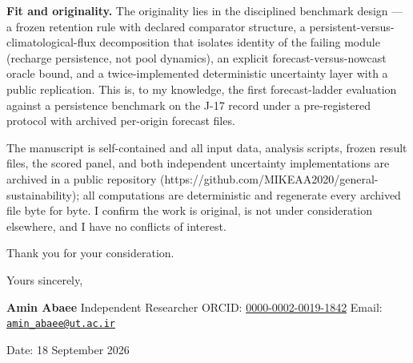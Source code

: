 \documentclass[11pt]{article}
\begin{document}
\textbf{Fit and originality.} The originality lies in the disciplined
benchmark design --- a frozen retention rule with declared comparator
structure, a persistent-versus-climatological-flux decomposition that
isolates identity of the failing module (recharge persistence, not pool
dynamics), an explicit forecast-versus-nowcast oracle bound, and a
twice-implemented deterministic uncertainty layer with a public
replication. This is, to my knowledge, the first forecast-ladder
evaluation against a persistence benchmark on the J-17 record under a
pre-registered protocol with archived per-origin forecast files.

The manuscript is self-contained and all input data, analysis scripts,
frozen result files, the scored panel, and both independent uncertainty
implementations are archived in a public repository
(https://github.com/MIKEAA2020/general-sustainability); all computations
are deterministic and regenerate every archived file byte for byte. I
confirm the work is original, is not under consideration elsewhere, and
I have no conflicts of interest.

Thank you for your consideration.

Yours sincerely,

\textbf{Amin Abaee} Independent Researcher ORCID:
\href{https://orcid.org/0000-0002-0019-1842}{0000-0002-0019-1842} Email:
\href{mailto:amin_abaee@ut.ac.ir}{\nolinkurl{amin\_abaee@ut.ac.ir}}

Date: 18 September 2026
\end{document}
